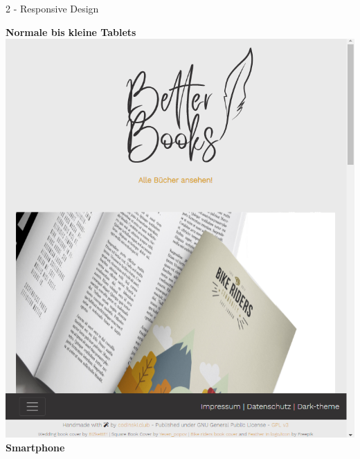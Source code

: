 \documentclass[a4paper]{article}
\begin{document}
\begin{exercise}{2 - Responsive Design}
\begin{flushleft}
{\Large \textbf{Normale bis kleine Tablets}}\\
\includegraphics[scale=0.5]{../2_bookstore_main_tab}\\
\newpage
{\Large \textbf{Smartphone}}\\

\end{flushleft}
\end{exercise}
\end{document}

